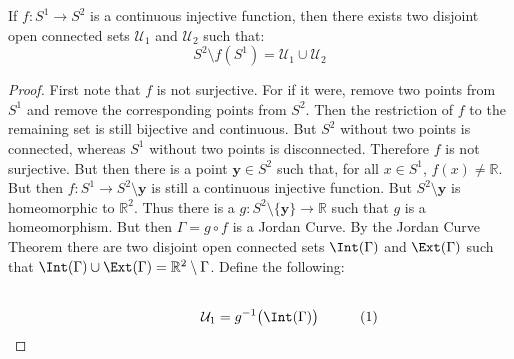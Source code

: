 \documentclass[crop=false,class=book,oneside]{standalone}                      %
\begin{document}
            \begin{theorem}
                \label{theorem:Sphere_Without_Circle_Is_Disconnected}
                If $f:S^{1}\rightarrow{S}^{2}$ is a continuous injective
                function, then there exists two disjoint open connected
                sets $\mathcal{U}_{1}$ and $\mathcal{U}_{2}$ such that:
                \begin{equation}
                    S^{2}\setminus{f}(S^{1})
                    =\mathcal{U}_{1}\cup\mathcal{U}_{2}
                \end{equation}
            \end{theorem}
            \begin{proof}
                First note that $f$ is not surjective. For if it were,
                remove two points from $S^{1}$ and remove the corresponding
                points from $S^{2}$. Then the restriction of $f$ to the
                remaining set is still bijective and continuous. But
                $S^{2}$ without two points is connected, whereas $S^{1}$
                without two points is disconnected. Therefore $f$ is not
                surjective. But then there is a point $\mathbf{y}\in{S}^{2}$
                such that, for all $x\in{S}^{1}$, $f(x)\ne\mathbb{R}$.
                But then $f:S^{1}\rightarrow{S}^{2}\setminus\mathbf{y}$
                is still a continuous injective function. But
                $S^{2}\setminus\mathbf{y}$ is homeomorphic to $\mathbb{R}^{2}$.
                Thus there is a
                $g:S^{2}\setminus\{\mathbf{y}\}\rightarrow\mathbb{R}$
                such that $g$ is a homeomorphism. But then $\Gamma=g\circ{f}$
                is a Jordan Curve. By the Jordan Curve Theorem there are two disjoint
                open connected sets $\Int(\Gamma)$ and $\Ext(\Gamma)$ such that
                $\Int(\Gamma)\cup\Ext(\Gamma)=\mathbb{R}^{2}\setminus\Gamma$.
                Define the following:
                \par
                \begin{subequations}
                    \begin{minipage}[b]{0.49\textwidth}
                        \centering
                        \begin{equation}
                            \mathcal{U}_{1}=g^{-1}\big(\Int(\Gamma)\big)
                        \end{equation}
                    \end{minipage}
                    \hfill
                    \begin{minipage}[b]{0.49\textwidth}

\end{minipage}
\end{subequations}
\end{proof}
\end{document}
